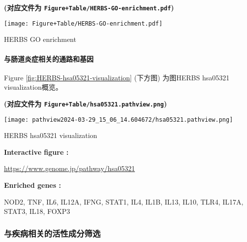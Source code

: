 \documentclass[
]{article}
\begin{document}
\textbf{(对应文件为 \texttt{Figure+Table/HERBS-GO-enrichment.pdf})}

\def\@captype{figure}
\begin{center}
\texttt{[image: Figure+Table/HERBS-GO-enrichment.pdf]}
\caption{HERBS GO enrichment}\label{fig:HERBS-GO-enrichment}
\end{center}

\hypertarget{ux4e0eux80a0ux9053ux708eux75c7ux76f8ux5173ux7684ux901aux8defux548cux57faux56e0}{%
\paragraph{与肠道炎症相关的通路和基因}\label{ux4e0eux80a0ux9053ux708eux75c7ux76f8ux5173ux7684ux901aux8defux548cux57faux56e0}}

Figure \ref{fig:HERBS-hsa05321-visualization} (下方图) 为图HERBS hsa05321 visualization概览。

\textbf{(对应文件为 \texttt{Figure+Table/hsa05321.pathview.png})}

\def\@captype{figure}
\begin{center}
\texttt{[image: pathview2024-03-29\_15\_06\_14.604672/hsa05321.pathview.png]}
\caption{HERBS hsa05321 visualization}\label{fig:HERBS-hsa05321-visualization}
\end{center}
\begin{center}\begin{tcolorbox}[colback=gray!10, colframe=gray!50, width=0.9\linewidth, arc=1mm, boxrule=0.5pt]
\textbf{
Interactive figure
:}

\vspace{0.5em}

    \url{https://www.genome.jp/pathway/hsa05321}

\vspace{2em}


\textbf{
Enriched genes
:}

\vspace{0.5em}

    NOD2, TNF, IL6, IL12A, IFNG, STAT1, IL4, IL1B, IL13,
IL10, TLR4, IL17A, STAT3, IL18, FOXP3

\vspace{2em}
\end{tcolorbox}
\end{center}

\hypertarget{ux4e0eux75beux75c5ux76f8ux5173ux7684ux6d3bux6027ux6210ux5206ux7b5bux9009}{%
\subsubsection{与疾病相关的活性成分筛选}\label{ux4e0eux75beux75c5ux76f8ux5173ux7684ux6d3bux6027ux6210ux5206ux7b5bux9009}}
\end{document}
